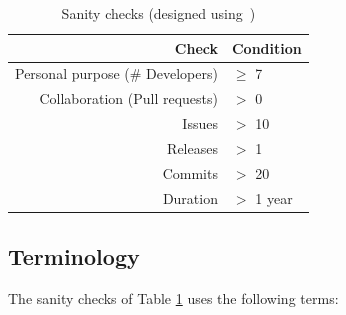 \documentclass[sigconf,review,anonymous]{acmart}
\begin{document}


\begin{table}[!t]
\caption{Sanity checks (designed using~\cite{Kalliamvakou:2014})}\label{tbl:sanity}
\begin{center}
 \begin{tabular}{r|l}
 Check   & Condition    \\\hline
Personal purpose (\# Developers) & $\geq$ 7 \\
Collaboration (Pull requests)  & $>$ 0 \\
Issues & $>$ 10 \\
Releases &  $>$ 1 \\
Commits & $>$ 20 \\
Duration  & $>$ 1 year 
\end{tabular}%
\end{center}
\end{table}



\subsection{Terminology}


The sanity checks of Table \ref{tbl:sanity} 
uses the following terms:
\end{document}

